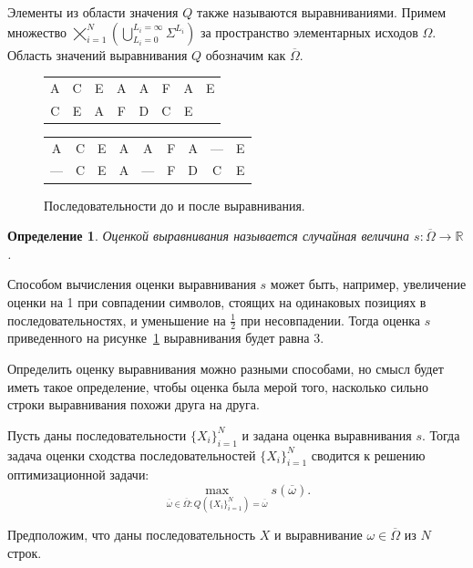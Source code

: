 \documentclass[specialist,
substylefile = spbu_report.rtx,
subf,href,colorlinks=true, 12pt]{disser}
\newtheorem{defenition}{Определение}
\begin{document}
		Элементы из области значения $Q$ также называются выравниваниями. Примем множество $\bigtimes_{i=1}^{N}(\bigcup_{L_i=0}^{L_i=\infty} \Sigma^{L_i})$ за пространство элементарных исходов $\Omega$. Область значений выравнивания $Q$ обозначим как $\overline \Omega$.
		
		\begin{figure}[H]
			\centering
			\begin{tabular}{cccccccc}
				A&C&E&A&A&F&A&E\\
				C&E&A&F&D&C&E&
			\end{tabular}
		\end{figure}
		\begin{figure}[H]
			\centering
			\begin{tabular}{ccccccccc}
				A&C&E&A&A&F&A&—&E\\
				—&C&E&A&—&F&D&C&E
			\end{tabular}
			\caption{Последовательности до и после выравнивания.} \label{fg:1}
		\end{figure}
		
		\begin{defenition}				
			Оценкой выравнивания называется случайная величина $s:\overline \Omega \rightarrow \mathbb{R}$.
		\end{defenition}	
		
		Способом вычисления оценки выравнивания $s$ может быть, например, увеличение оценки на 1 при совпадении символов, стоящих на одинаковых позициях в последовательностях, и уменьшение на $\frac{1}{2}$ при несовпадении. Тогда оценка $s$ приведенного на рисунке~\ref{fg:1} выравнивания будет равна 3.
						
		Определить оценку выравнивания можно разными способами, но смысл будет иметь такое определение, чтобы оценка была мерой того, насколько сильно строки выравнивания похожи друга на друга.
		
		Пусть даны последовательности $\{X_i\}_{i=1}^{N}$ и задана оценка выравнивания $s$. Тогда задача оценки сходства последовательностей $\{X_i\}_{i=1}^{N}$ сводится к решению оптимизационной задачи:		
		\begin{equation*}
			\max_{\overline{\omega} \in \overline{\Omega} : Q(\{X_i\}_{i=1}^{N}) = \overline{\omega}}s(\overline{\omega}).
		\end{equation*}	
	
		Предположим, что даны последовательность $X$ и выравнивание $\omega \in \overline{\Omega}$ из $N$ строк. 
				
\end{document}
